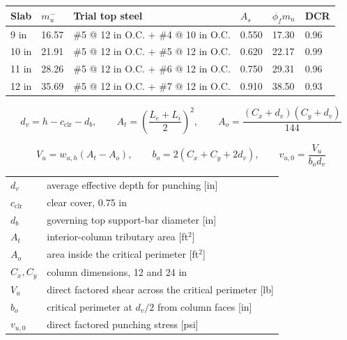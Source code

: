 \documentclass[10pt]{article}
\begin{document}


{\ttfamily\footnotesize
\renewcommand{\arraystretch}{1.15}
\begin{tabular}{@{}p{0.55in}p{0.85in}p{2.25in}p{0.75in}p{0.95in}p{0.70in}@{}}
Slab & $m_u^-$ & Trial top steel & $A_s$ & $\phi_fm_n$ & DCR \\
\hline
9 in  & 16.57 & \#5 @ 12 in O.C. + \#4 @ 10 in O.C. & 0.550 & 17.30 & 0.96 \\
10 in & 21.91 & \#5 @ 12 in O.C. + \#5 @ 12 in O.C. & 0.620 & 22.17 & 0.99 \\
11 in & 28.26 & \#5 @ 12 in O.C. + \#6 @ 12 in O.C. & 0.750 & 29.31 & 0.96 \\
12 in & 35.69 & \#5 @ 12 in O.C. + \#7 @ 12 in O.C. & 0.910 & 38.50 & 0.93 \\
\end{tabular}
}


\clearpage
{}

\begin{equation}
d_v=h-c_{\text{clr}}-d_b,
\qquad
A_t=\left(\frac{L_e+L_i}{2}\right)^2,
\qquad
A_o=\frac{(C_x+d_v)(C_y+d_v)}{144}
\end{equation}

\begin{equation}
V_u=w_{u,h}(A_t-A_o),
\qquad
b_o=2(C_x+C_y+2d_v),
\qquad
v_{u,0}=\frac{V_u}{b_od_v}
\end{equation}

{\ttfamily\footnotesize
\begin{tabular}{@{}ll@{}}
$d_v$ & average effective depth for punching [in] \\
$c_{\text{clr}}$ & clear cover, 0.75 in \\
$d_b$ & governing top support-bar diameter [in] \\
$A_t$ & interior-column tributary area [ft$^2$] \\
$A_o$ & area inside the critical perimeter [ft$^2$] \\
$C_x,C_y$ & column dimensions, 12 and 24 in \\
$V_u$ & direct factored shear across the critical perimeter [lb] \\
$b_o$ & critical perimeter at $d_v/2$ from column faces [in] \\
$v_{u,0}$ & direct factored punching stress [psi] \\
\end{tabular}
}
\end{document}
